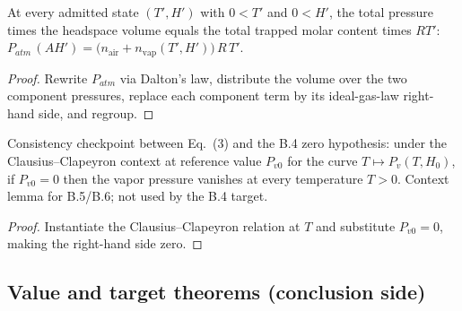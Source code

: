 \begin{lemma}
\label{lem:IPhO2026Problems_problem_IPhO_2026_4_B_4:total_pressure_mul_volume}
At every admitted state $(T', H')$ with $0 < T'$ and $0 < H'$, the total
pressure times the headspace volume equals the total trapped molar
content times $R T'$:
$P_{atm}\,(A H') = \bigl(n_{\mathrm{air}} + n_{\mathrm{vap}}(T',H')\bigr)\, R\, T'$.
\end{lemma}
\begin{proof}
Rewrite $P_{atm}$ via Dalton's law, distribute the volume over the two
component pressures, replace each component term by its ideal-gas-law
right-hand side, and regroup.
\end{proof}

\begin{lemma}
\label{lem:IPhO2026Problems_problem_IPhO_2026_4_B_4:eq_zero_of_clausiusClapeyron_zero}
Consistency checkpoint between Eq.\ (3) and the B.4 zero hypothesis:
under the Clausius--Clapeyron context at reference value $P_{v0}$ for the
curve $T \mapsto P_v(T, H_0)$, if $P_{v0} = 0$ then the vapor pressure
vanishes at every temperature $T > 0$.  Context lemma for B.5/B.6; not
used by the B.4 target.
\end{lemma}
\begin{proof}
Instantiate the Clausius--Clapeyron relation at $T$ and substitute
$P_{v0} = 0$, making the right-hand side zero.
\end{proof}

\subsection*{Value and target theorems (conclusion side)}

